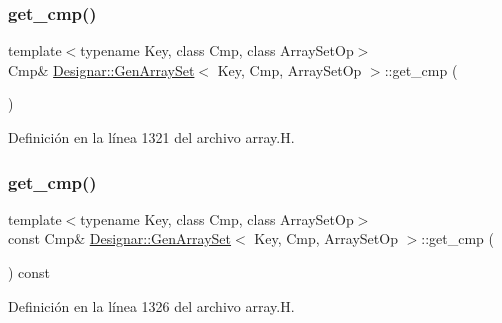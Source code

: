 \subsubsection{\texorpdfstring{get\+\_\+cmp()}{get\_cmp()}\hspace{0.1cm}{\footnotesize\ttfamily [1/2]}}
{\footnotesize\ttfamily template$<$typename Key, class Cmp, class Array\+Set\+Op$>$ \\
Cmp\& \hyperlink{class_designar_1_1_gen_array_set}{Designar\+::\+Gen\+Array\+Set}$<$ Key, Cmp, Array\+Set\+Op $>$\+::get\+\_\+cmp (\begin{DoxyParamCaption}{ }\end{DoxyParamCaption})\hspace{0.3cm}{\ttfamily [inline]}}



Definición en la línea 1321 del archivo array.\+H.

\mbox{\label{class_designar_1_1_gen_array_set_a30409051572881ed638f79debfad8188}} 
\subsubsection{\texorpdfstring{get\+\_\+cmp()}{get\_cmp()}\hspace{0.1cm}{\footnotesize\ttfamily [2/2]}}
{\footnotesize\ttfamily template$<$typename Key, class Cmp, class Array\+Set\+Op$>$ \\
const Cmp\& \hyperlink{class_designar_1_1_gen_array_set}{Designar\+::\+Gen\+Array\+Set}$<$ Key, Cmp, Array\+Set\+Op $>$\+::get\+\_\+cmp (\begin{DoxyParamCaption}{ }\end{DoxyParamCaption}) const\hspace{0.3cm}{\ttfamily [inline]}}



Definición en la línea 1326 del archivo array.\+H.

\mbox{\label{class_designar_1_1_gen_array_set_aca8ce9f7cb1ded74fd8067a535817836}} 
